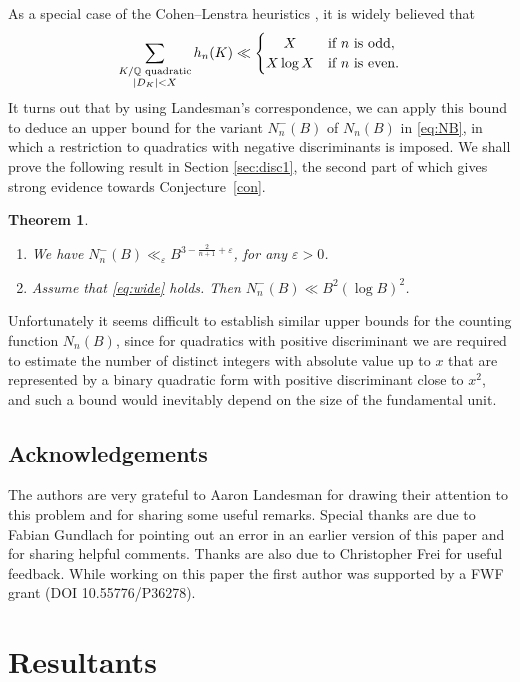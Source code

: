 \documentclass[reqno, 12pt, twoside]{amsart}
\numberwithin{equation}{section}
\newcommand{\QQ}{\mathbb{Q}}
\newcommand{\ve}{\varepsilon}
\newcommand{\0}{\mathbf{0}}
\newtheorem{theorem}{Theorem}[section]
\theoremstyle{definition}
\begin{document}
As a special case of the Cohen--Lenstra heuristics \cite{CL},
it is widely believed that 
\begin{equation}\label{eq:wide}
\sum_{
\substack{K/\QQ \text{ quadratic}\\
|D_K|<X
}}  h_n(K)\ll 
\begin{cases}
\hfil X&\text{if $n$ is odd},\\
\hfil X\log X&\text{if $n$ is even}.
\end{cases}
\end{equation}
It turns out that by using Landesman's correspondence, we can 
apply this bound to deduce an upper bound for the variant $N_n^-(B)$ of $N_n(B)$ in \eqref{eq:NB}, in which a restriction to quadratics with 
negative   discriminants is imposed. 
We shall prove the following result in Section \ref{sec:disc1}, the second part of which gives strong evidence towards Conjecture~\ref{con}.

\begin{theorem}\label{t:lama}
 \begin{enumerate}
\item 
We have $N_n^-(B)\ll_\ve 
B^{3-\frac{2}{n+1}+\ve}$,
for any $\ve>0$.
\item
Assume that \eqref{eq:wide} holds. Then $N_n^-(B)\ll B^2(\log B)^2$. 
\end{enumerate}
\end{theorem}

Unfortunately it seems difficult  to establish similar  upper bounds for the counting function $N_n(B)$, since for quadratics with positive discriminant we are required to 
estimate the number of  distinct integers with absolute value up to $x$ that are represented by a binary quadratic form with positive discriminant close to $x^2$, and such a bound would inevitably depend on the size of the fundamental unit. 


\subsection*{Acknowledgements}
The  authors are very grateful to Aaron Landesman  
for drawing their attention to this problem and for sharing some useful remarks.
Special thanks are due to Fabian Gundlach for pointing out an error in an earlier version of this paper and for sharing helpful comments. Thanks are also due to 
Christopher Frei for useful feedback. 
While working on this paper
the first author was supported  by 
a FWF grant (DOI 10.55776/P36278).


\section{Resultants}
\end{document}
